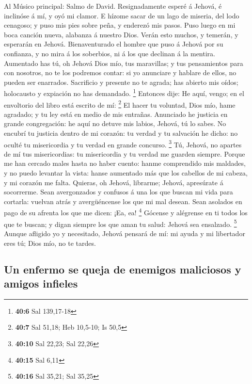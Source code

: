  Al Músico principal: Salmo de David. Resignadamente esperé
á Jehová, é inclinóse á mí, y oyó mi clamor.  E hízome sacar
de un lago de miseria, del lodo cenagoso; y puso mis pies sobre peña, y
enderezó mis pasos.  Puso luego en mi boca canción nueva,
alabanza á nuestro Dios. Verán esto muchos, y temerán, y esperarán en
Jehová.  Bienaventurado el hombre que puso á Jehová por su
confianza, y no mira á los soberbios, ni á los que declinan á la
mentira.  Aumentado has tú, oh Jehová Dios mío, tus
maravillas; y tus pensamientos para con nosotros, no te los podremos
contar: si yo anunciare y hablare de ellos, no pueden ser enarrados.
 Sacrificio y presente no te agrada; has abierto mis oídos;
holocausto y expiación no has demandado. \footnote{\textbf{40:6} Sal
  139,17-18}  Entonces dije: He aquí, vengo; en el
envoltorio del libro está escrito de mí: \footnote{\textbf{40:7} Sal
  51,18; Heb 10,5-10; Is 50,5}  El hacer tu voluntad, Dios
mío, hame agradado; y tu ley está en medio de mis entrañas. 
Anunciado he justicia en grande congregación: he aquí no detuve mis
labios, Jehová, tú lo sabes.  No encubrí tu justicia dentro
de mi corazón: tu verdad y tu salvación he dicho: no oculté tu
misericordia y tu verdad en grande concurso. \footnote{\textbf{40:10}
  Sal 22,23; Sal 22,26}  Tú, Jehová, no apartes de mí tus
misericordias: tu misericordia y tu verdad me guarden siempre.
 Porque me han cercado males hasta no haber cuento: hanme
comprendido mis maldades, y no puedo levantar la vista: hanse aumentado
más que los cabellos de mi cabeza, y mi corazón me falta. 
Quieras, oh Jehová, librarme; Jehová, apresúrate á socorrerme.
 Sean avergonzados y confusos á una los que buscan mi vida
para cortarla: vuelvan atrás y avergüéncense los que mi mal desean.
 Sean asolados en pago de su afrenta los que me dicen: ¡Ea,
ea! \footnote{\textbf{40:15} Sal 6,11}  Gócense y alégrense
en ti todos los que te buscan; y digan siempre los que aman tu salud:
Jehová sea ensalzado. \footnote{\textbf{40:16} Sal 35,21; Sal 35,25}
 Aunque afligido yo y necesitado, Jehová pensará de mí: mi
ayuda y mi libertador eres tú; Dios mío, no te tardes.

\hypertarget{un-enfermo-se-queja-de-enemigos-maliciosos-y-amigos-infieles}{%
\subsection{Un enfermo se queja de enemigos maliciosos y amigos
infieles}\label{un-enfermo-se-queja-de-enemigos-maliciosos-y-amigos-infieles}}

